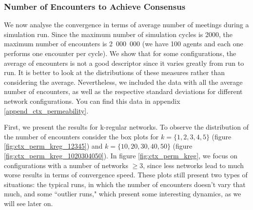 \documentclass[preprint,number]{elsarticle}
\begin{document}
\subsubsection{Number of Encounters to Achieve Consensus}
\label{sec:ctx_perm_encounters}
\noindent We now analyse the convergence in terms of average number of meetings during a simulation run. Since the maximum number of simulation cycles is 2000, the maximum number of encounters is 2~000~000 (we have 100 agents and each one performs one encounter per cycle). We show that for some configurations, the average of encounters is not a good descriptor since it varies greatly from run to run. It is better to look at the distributions of these measures rather than considering the average. Nevertheless, we included the data with all the average number of encounters, as well as the respective standard deviations for different network configurations. You can find this data in appendix \ref{append_ctx_permeability}.

First, we present the results for k-regular networks. To observe the distribution of the number of encounters consider the box plots for $k = \{1,2,3,4,5\}$ (figure \ref{fig:ctx_perm_kreg_12345}) and $k =\{10,20,30,40,50\}$ (figure \ref{fig:ctx_perm_kreg_1020304050}). In figure \ref{fig:ctx_perm_kreg}, we focus on configurations with a number of networks $\ge 3$, since less networks lead to much worse results in terms of convergence speed. These plots still present two types of situations: the typical runs, in which the number of encounters doesn't vary that much, and some ``outlier runs," which present some interesting dynamics, as we will see later on.
\end{document}
